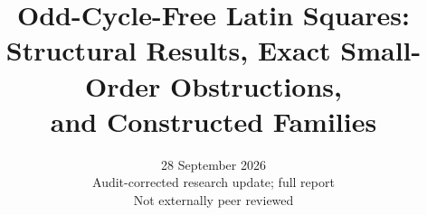 \documentclass[11pt]{article}
\title{Odd-Cycle-Free Latin Squares:\\
Structural Results, Exact Small-Order Obstructions,\\
and Constructed Families}
\author{}
\date{28 September 2026\\\small Audit-corrected research update; full report\\Not externally peer reviewed}
\begin{document}
\maketitle


\tableofcontents






















\footnotesize


\end{document}
